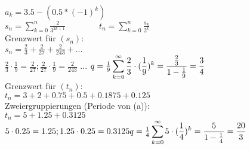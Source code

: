 \(a_k = 3.5-(0.5*(-1)^k)\)\\
\(s_n = \displaystyle\sum_{k=0}^n\frac{2}{3^{2k+1}}\quad \quad \quad \quad t_n = \displaystyle\sum_{k=0}^n\frac{a_k}{2^{k}}\)\\

Grenzwert für \((s_n)\):\\
\(s_n = \frac{2}{3} + \frac{2}{27} + \frac{2}{243} +...\)\\
\(\frac{2}{3} \cdot \frac{1}{9} = \frac{2}{27}; \frac{2}{27} \cdot \frac{1}{9} = \frac{2}{243} \) ...
\( q = \frac{1}{9} \\
\displaystyle\sum_{k=0}^\infty\frac{2}{3}\cdot(\frac{1}{9})^k = \frac{\frac{2}{3}}{1-\frac{1}{9}}= \\\frac{3}{4}\)\\

Grenzwert für \((t_n)\):\\
\(t_n = 3 + 2 + 0.75 +0.5 + 0.1875 + 0.125 \) \\
Zweiergruppierungen (Periode von (a)): \\
\(t_n = 5 + 1.25 + 0.3125\)\\
\(5 \cdot 0.25 = 1.25 ; 1.25 \cdot 0.25 = 0.3125 \\
q = \frac{1}{4} \\
\displaystyle\sum_{k=0}^\infty5\cdot(\frac{1}{4})^k = \frac{5}{1-\frac{1}{4}}= \\\frac{20}{3}\)\\
